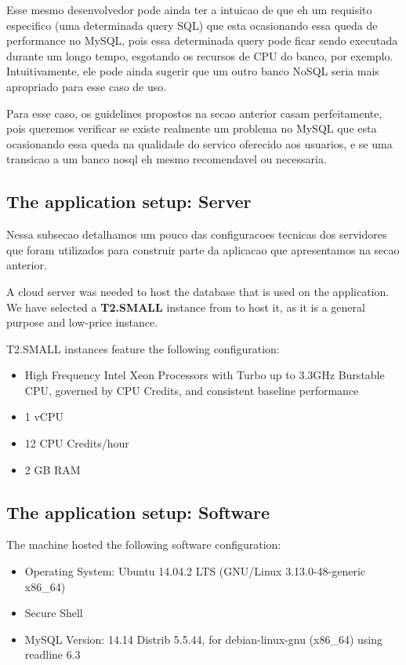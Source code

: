Esse mesmo desenvolvedor pode ainda ter a intuicao de que eh um requisito especifico (uma determinada query SQL) que esta ocasionando essa queda de performance no MySQL, pois essa determinada query pode ficar sendo executada durante um longo tempo, esgotando os recursos de CPU do banco, por exemplo. Intuitivamente, ele pode ainda sugerir que um outro banco NoSQL seria mais apropriado para esse caso de uso.  

Para esse caso, os guidelines propostos na secao anterior casam perfeitamente, pois queremos verificar se existe realmente um problema no MySQL que esta ocasionando essa queda na qualidade do servico oferecido aos usuarios, e se uma transicao a um banco nosql eh mesmo recomendavel ou necessaria. 


\subsection{The application setup: Server}

Nessa subsecao detalhamos um pouco das configuracoes tecnicas dos servidores que foram utilizados para construir parte da aplicacao que apresentamos na secao anterior. 

A cloud server was needed to host the database that is used on the application. We have selected a \textbf{T2.SMALL} instance from \cite{amazonec2} to host it, as it is a general purpose and low-price instance.

T2.SMALL instances feature the following configuration:

\begin{itemize}
\item{High Frequency Intel Xeon Processors with Turbo up to 3.3GHz Burstable CPU, governed by CPU Credits, and consistent baseline performance}
\item{1 vCPU}
\item{12 CPU Credits/hour}
\item{2 GB RAM}
\end{itemize}

\subsection{The application setup: Software}
The machine hosted the following software configuration: 

\begin{itemize}
\item{Operating System: Ubuntu 14.04.2 LTS (GNU/Linux 3.13.0-48-generic x86\_64)}
\item{Secure Shell}
\item{MySQL Version: 14.14 Distrib 5.5.44, for debian-linux-gnu (x86\_64) using readline 6.3}
\end{itemize}

